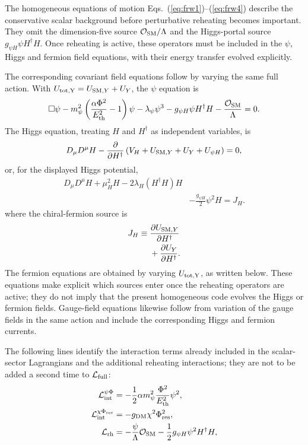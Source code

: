 \documentclass[epj]{svjour}
\begin{document}
The homogeneous equations of motion
Eqs.~(\ref{eq:frw1})--(\ref{eq:frw4}) describe the conservative scalar
background before perturbative reheating becomes important. They omit
the dimension-five source $\mathcal O_{\rm SM}/\Lambda$ and the
Higgs-portal source $g_{\psi H}\psi H^\dagger H$. Once reheating is
active, these operators must be included in the $\psi$, Higgs and
fermion field equations, with their energy transfer evolved
explicitly.

The corresponding covariant field equations follow by varying the
same full action. With
\(U_{\rm tot,Y}=U_{{\rm SM},Y}+U_Y\), the \(\psi\) equation is
\begin{equation}
\Box\psi
-m_\psi^2\left(\frac{\alpha\Phi^2}{E_{\rm th}^2}-1\right)\psi
-\lambda_\psi\psi^3
-g_{\psi H}\psi H^\dagger H
-\frac{\mathcal O_{\rm SM}}{\Lambda}=0.
\label{eq:psi_full_reheating_eom}
\end{equation}
The Higgs equation, treating \(H\) and \(H^\dagger\) as independent
variables, is
\begin{equation}
D_\mu D^\mu H
-\frac{\partial}{\partial H^\dagger}
\left(V_H+U_{{\rm SM},Y}+U_Y+U_{\psi H}\right)=0,
\label{eq:higgs_full_reheating_eom}
\end{equation}
or, for the displayed Higgs potential,
\begin{equation}
\begin{aligned}
D_\mu D^\mu H+\mu_H^2H
-2\lambda_H(H^\dagger H)H\\
&-\frac{g_{\psi H}}{2}\psi^2H
=J_H.
\end{aligned}
\end{equation}
where the chiral-fermion source is
\begin{equation}
\begin{aligned}
J_H \equiv{}&
\frac{\partial U_{{\rm SM},Y}}{\partial H^\dagger}\\
&+\frac{\partial U_Y}{\partial H^\dagger}.
\end{aligned}
\end{equation}
The fermion equations are obtained by varying
\(U_{\rm tot,Y}\), as written below. These equations make explicit
which sources enter once the reheating operators are active; they do
not imply that the present homogeneous code evolves the Higgs or
fermion fields. Gauge-field equations likewise follow from variation
of the gauge fields in the same action and include the corresponding
Higgs and fermion currents.

The following lines identify the interaction terms already included in the scalar-sector Lagrangians and the additional reheating interactions; they are not to be added a second time to \(\mathcal{L}_{\rm full}\):
\begin{align}
\mathcal{L}_{\rm int}^{\psi\Phi} &= -\frac{1}{2}\alpha m_\psi^2 \frac{\Phi^2}{E_{\rm th}^2} \psi^2, \\
\mathcal{L}_{\rm int}^{\chi\Phi_{\rm res}} &= -g_{\rm DM} \chi^2 \Phi_{\rm res}^2, \\
\mathcal{L}_{\rm rh} &= -\frac{\psi}{\Lambda}\mathcal{O}_{\rm SM}
-\frac{1}{2}g_{\psi H}\psi^2 H^\dagger H,
\end{align}
\end{document}
